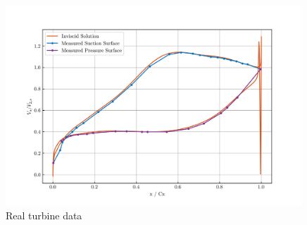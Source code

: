 \documentclass{article}
\begin{document}
\begin{figure}[H]
    \centering
    \includegraphics[width=0.99\textwidth]{figures/turbine_real.png}
    \caption{Real turbine data \cite{4A3_lab}}
    \label{fig:turbine_real}
\end{figure}
\end{document}

